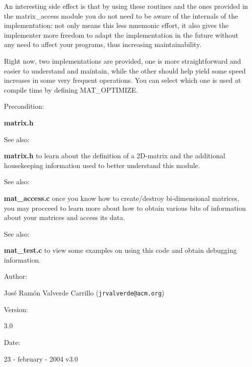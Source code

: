 An interesting side effect is that by using these routines and the ones provided in the matrix\_\-access module you do not need to be aware of the internals of the implementation: not only means this less mnemonic effort, it also gives the implementer more freedom to adapt the implementation in the future without any need to affect your programs, thus increasing maintainability.

Right now, two implementations are provided, one is more straightforward and easier to understand and maintain, while the other should help yield some speed increases in some very frequent operations. You can select which one is used at compile time by defining  MAT\_\-OPTIMIZE.

\begin{Desc}
\item[Precondition: ]\par
{\bf matrix.h}\end{Desc}
\begin{Desc}
\item[See also: ]\par
{\bf matrix.h} to learn about the definition of a  2D-matrix and the additional housekeeping information used to better understand this module.\end{Desc}
\begin{Desc}
\item[See also: ]\par
{\bf mat\_\-access.c} once you know how to create/destroy bi-dimensional  matrices, you may procceed to learn more about how to obtain various bits of information about your matrices and access its data.\end{Desc}
\begin{Desc}
\item[See also: ]\par
{\bf mat\_\-test.c} to view some examples on using this code and obtain debugging information.\end{Desc}
\begin{Desc}
\item[Author: ]\par
Jos\'{e} Ram\'{o}n Valverde Carrillo ({\tt jrvalverde@acm.org})\end{Desc}
\begin{Desc}
\item[Version: ]\par
3.0\end{Desc}
\begin{Desc}
\item[Date: ]\par
23 - february - 2004 v3.0\end{Desc}
